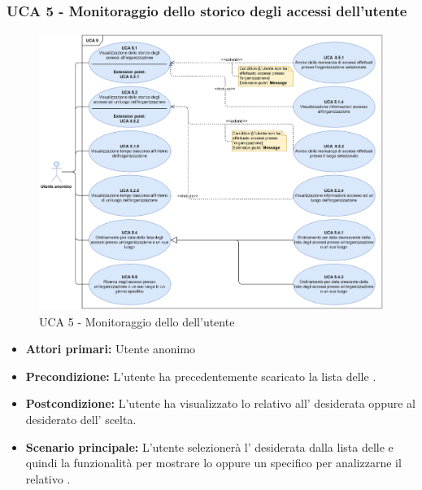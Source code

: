 \subsubsection{UCA 5 - Monitoraggio dello storico degli accessi dell'utente}

\begin{figure}[h]
	\centering	
	\includegraphics[scale=0.6]{Sezioni/UseCase/Immagini/UCA5.png}
	\caption{UCA 5 - Monitoraggio dello  dell'utente}
\end{figure}

\begin{itemize}
    \item \textbf{Attori primari:} Utente anonimo
    \item \textbf{Precondizione:} L'utente ha precedentemente scaricato la lista delle .
    \item \textbf{Postcondizione:} L'utente ha visualizzato lo  relativo all' desiderata oppure al  desiderato dell' scelta.
    \item \textbf{Scenario principale:} L'utente selezionerà l' desiderata dalla lista delle  e quindi la funzionalità per mostrare lo  oppure un  specifico per analizzarne il relativo .
\end{itemize}

